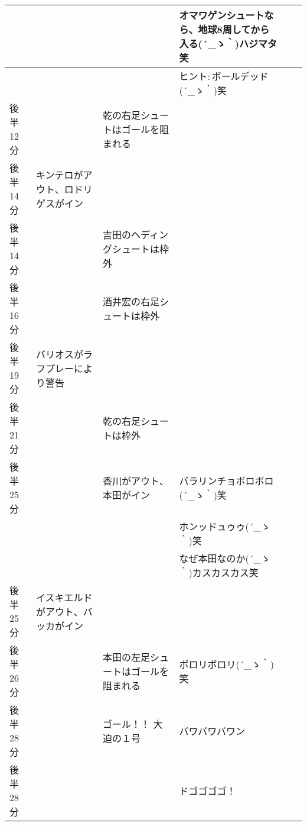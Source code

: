 \begin{table}[htb]
{\begin{tabular}{|l|l|l|l|l|l|}
                &                                              &                                       & オマワゲンシュートなら、地球8周してから入る\sf (´\_ゝ｀)ハジマタ笑  \\ \hline
                &                                              &                                       & ヒント$:$ボールデッド\sf (´\_ゝ｀)笑 \\ \hline
      後半12分  &                                              & 乾の右足シュートはゴールを阻まれる    & \\ \hline
      後半14分  & キンテロがアウト、ロドリゲスがイン           &                                       & \\ \hline
      後半14分  &                                              & 吉田のヘディングシュートは枠外        &      \\ \hline
      後半16分  &                                              & 酒井宏の右足シュートは枠外            &   \\ \hline
      後半19分  & バリオスがラフプレーにより警告               &                                       &  \\ \hline
      後半21分  &                                              & 乾の右足シュートは枠外                & \\ \hline
      後半25分  &                                              & 香川がアウト、本田がイン              & バラリンチョボロボロ\sf (´\_ゝ｀)笑 \\ \hline
                &                                              &                                       & ホンッドュゥゥ\sf (´\_ゝ｀)笑 \\ \hline
                &                                              &                                       & なぜ本田なのか\sf (´\_ゝ｀)カスカスカス笑 \\ \hline
      後半25分  & イスキエルドがアウト、バッカがイン           &                                       &  \\ \hline
      後半26分  &                                              & 本田の左足シュートはゴールを阻まれる  & ボロリボロリ\sf (´\_ゝ｀)笑\\ \hline
      後半28分  &                                              & ゴール！！ 大迫の１号                 & バワバワバワン  \\ \hline
      後半28分  &                                              &                                       & ドゴゴゴゴ！ \\ \hline

\end{tabular}}
\end{table}
